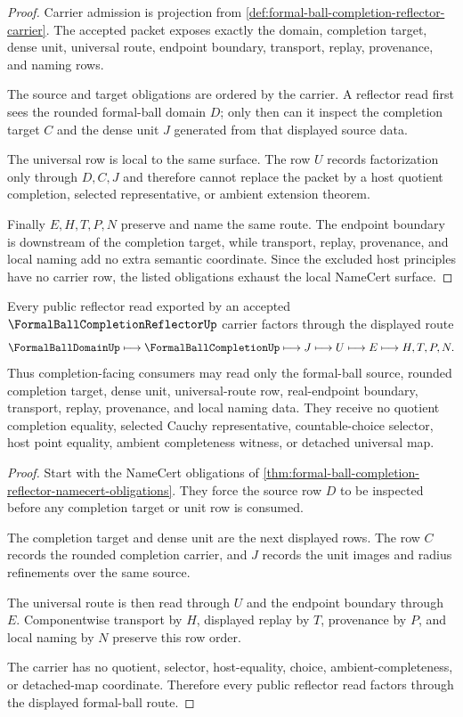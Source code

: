 \begin{proof}
Carrier admission is projection from \autoref{def:formal-ball-completion-reflector-carrier}. The accepted packet exposes exactly the domain, completion target, dense unit, universal route, endpoint boundary, transport, replay, provenance, and naming rows.

The source and target obligations are ordered by the carrier. A reflector read first sees the rounded formal-ball domain $D$; only then can it inspect the completion target $C$ and the dense unit $J$ generated from that displayed source data.

The universal row is local to the same surface. The row $U$ records factorization only through $D,C,J$ and therefore cannot replace the packet by a host quotient completion, selected representative, or ambient extension theorem.

Finally $E,H,T,P,N$ preserve and name the same route. The endpoint boundary is downstream of the completion target, while transport, replay, provenance, and local naming add no extra semantic coordinate. Since the excluded host principles have no carrier row, the listed obligations exhaust the local NameCert surface.
\end{proof}

\begin{theorem}\label{thm:formal-ball-completion-reflector-universal-route}
Every public reflector read exported by an accepted $\FormalBallCompletionReflectorUp$ carrier factors through the displayed route
$$
\FormalBallDomainUp \longmapsto \FormalBallCompletionUp \longmapsto J \longmapsto U \longmapsto E \longmapsto H,T,P,N .
$$
Thus completion-facing consumers may read only the formal-ball source, rounded completion target, dense unit, universal-route row, real-endpoint boundary, transport, replay, provenance, and local naming data. They receive no quotient completion equality, selected Cauchy representative, countable-choice selector, host point equality, ambient completeness witness, or detached universal map.
\end{theorem}
\begin{proof}
Start with the NameCert obligations of \autoref{thm:formal-ball-completion-reflector-namecert-obligations}. They force the source row $D$ to be inspected before any completion target or unit row is consumed.

The completion target and dense unit are the next displayed rows. The row $C$ records the rounded completion carrier, and $J$ records the unit images and radius refinements over the same source.

The universal route is then read through $U$ and the endpoint boundary through $E$. Componentwise transport by $H$, displayed replay by $T$, provenance by $P$, and local naming by $N$ preserve this row order.

The carrier has no quotient, selector, host-equality, choice, ambient-completeness, or detached-map coordinate. Therefore every public reflector read factors through the displayed formal-ball route.
\end{proof}

